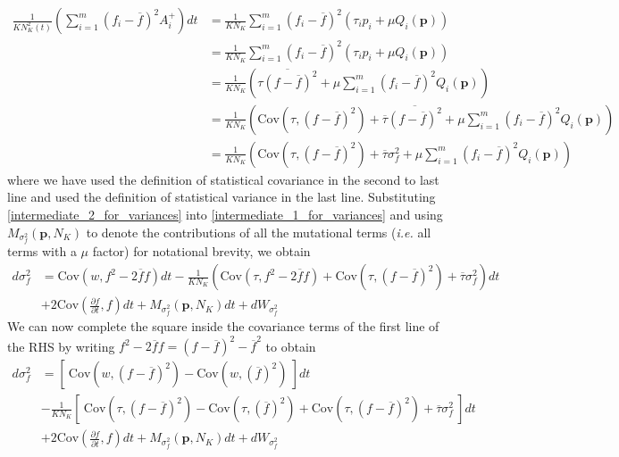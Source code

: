 \begin{align}
\frac{1}{KN^2_{K}(t)}\left(\sum\limits_{i=1}^{m}(f_i-\overline{f})^2A_i^+\right)dt &= \frac{1}{KN_{K}}\sum\limits_{i=1}^{m}(f_i-\overline{f})^2\left(\tau_ip_i + \mu Q_i(\mathbf{p})\right)\\
&= \frac{1}{KN_K}\sum\limits_{i=1}^{m}\left(f_i - \overline{f}\right)^2\left(\tau_ip_i + \mu Q_i(\mathbf{p})\right)\\
&= \frac{1}{KN_K}\left(\overline{\tau\left(f - \overline{f}\right)^2}+\mu \sum\limits_{i=1}^{m}\left(f_i - \overline{f}\right)^2Q_i(\mathbf{p})\right)\\
&= \frac{1}{KN_K}\left(\textrm{Cov}(\tau,\left(f - \overline{f}\right)^2) + \overline{\tau}\overline{\left(f - \overline{f}\right)^2} +\mu \sum\limits_{i=1}^{m}\left(f_i - \overline{f}\right)^2Q_i(\mathbf{p})\right)\\
&= \frac{1}{KN_K}\left(\textrm{Cov}(\tau,\left(f - \overline{f}\right)^2) + \overline{\tau}\sigma^2_{f} +\mu \sum\limits_{i=1}^{m}\left(f_i - \overline{f}\right)^2Q_i(\mathbf{p})\right)\label{intermediate_2_for_variances}
\end{align}
where we have used the definition of statistical covariance in the second to last line and used the definition of statistical variance in the last line. Substituting \eqref{intermediate_2_for_variances} into \eqref{intermediate_1_for_variances} and using $M_{\sigma^2_f}(\mathbf{p},N_K)$ to denote the contributions of all the mutational terms (\emph{i.e.} all terms with a $\mu$ factor) for notational brevity, we obtain
\begin{equation}
\begin{aligned}
d\sigma^2_{f} &= \textrm{Cov}(w,f^2 - 2\overline{f}f)dt - \frac{1}{KN_K}\left(\textrm{Cov}(\tau,f^2 - 2\overline{f}f) + \textrm{Cov}(\tau,\left(f - \overline{f}\right)^2) + \overline{\tau}\sigma^2_{f} \right)dt\\
&+ 2\textrm{Cov}\left(\frac{\partial f}{\partial t},f\right)dt + M_{\sigma^2_f}(\mathbf{p},N_K)dt + dW_{\sigma^2_{f}}
\end{aligned}
\end{equation}
We can now complete the square inside the covariance terms of the first line of the RHS by writing $f^2 - 2\overline{f}f = (f - \overline{f})^2 - \overline{f}^2$ to obtain
\begin{equation}
\label{intermediate_3_for_variances}
\begin{aligned}
d\sigma^2_{f} &= \left[ \ \textrm{Cov}\left(w,(f - \overline{f})^2\right)-\textrm{Cov}\left(w, {\left(\overline{f}\right)}^2\right) \ \right]dt\\[12pt]
&- \frac{1}{KN_K}\left[ \ \textrm{Cov}\left(\tau,(f - \overline{f})^2\right) - \textrm{Cov}\left(\tau, {\left(\overline{f}\right)}^2\right) + \textrm{Cov}(\tau,\left(f - \overline{f}\right)^2) + \overline{\tau}\sigma^2_{f} \ \right]dt\\[12pt]
& + 2\textrm{Cov}\left(\frac{\partial f}{\partial t},f\right)dt + M_{\sigma^2_f}(\mathbf{p},N_K)dt + dW_{\sigma^2_{f}}
\end{aligned}
\end{equation}
